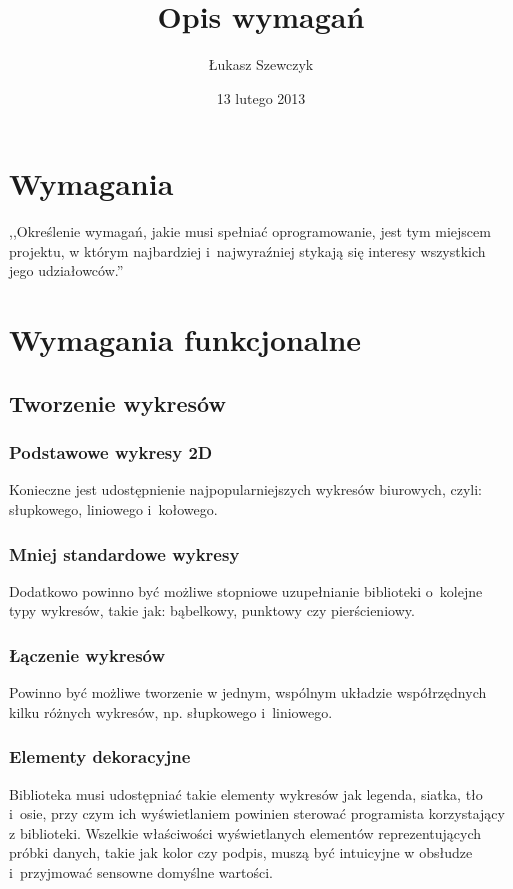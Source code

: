\documentclass[11pt,twoside,a4paper,final]{article}
\begin{document}
\date{13 lutego 2013}
\title{Opis wymagań}

\author{Łukasz Szewczyk}

\maketitle

\section{Wymagania}
,,Określenie wymagań, jakie musi spełniać oprogramowanie, jest tym miejscem projektu, w którym najbardziej i~najwyraźniej stykają się interesy wszystkich jego udziałowców.''~\cite{sacha-wymagania}

\section{Wymagania funkcjonalne}

\subsection{Tworzenie wykresów}

\subsubsection{Podstawowe wykresy 2D}
Konieczne jest udostępnienie najpopularniejszych wykresów biurowych, czyli: słupkowego, liniowego i~kołowego. 

\subsubsection{Mniej standardowe wykresy}
Dodatkowo powinno być możliwe stopniowe uzupełnianie biblioteki o~kolejne typy wykresów, takie jak: bąbelkowy, punktowy czy pierścieniowy.

\subsubsection{Łączenie wykresów}
Powinno być możliwe tworzenie w jednym, wspólnym układzie współrzędnych kilku różnych wykresów, np. słupkowego i~liniowego.

\subsubsection{Elementy dekoracyjne}
Biblioteka musi udostępniać takie elementy wykresów jak legenda, siatka, tło i~osie, przy czym ich wyświetlaniem powinien sterować programista korzystający z biblioteki. Wszelkie właściwości wyświetlanych elementów reprezentujących próbki danych, takie jak kolor czy podpis, muszą być intuicyjne w obsłudze i~przyjmować sensowne domyślne wartości.
\end{document}
